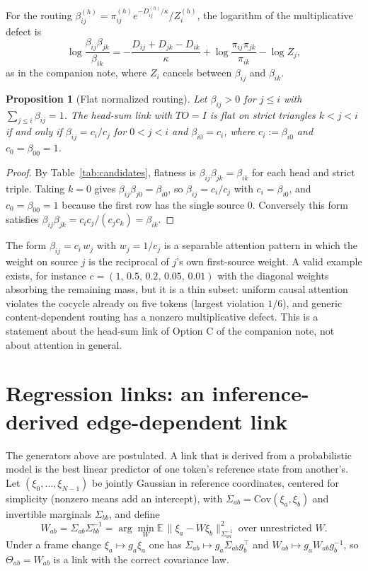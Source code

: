 \documentclass[11pt]{article}
\newtheorem{proposition}{Proposition}
\theoremstyle{definition}
\theoremstyle{remark}
\begin{document}
For the routing $\beta_{ij}^{(h)}=\pi_{ij}^{(h)}e^{-D_{ij}^{(h)}/\kappa}/Z_i^{(h)}$, the logarithm of the multiplicative defect is
\begin{equation}
\log\frac{\beta_{ij}\beta_{jk}}{\beta_{ik}}=-\frac{D_{ij}+D_{jk}-D_{ik}}{\kappa}+\log\frac{\pi_{ij}\pi_{jk}}{\pi_{ik}}-\log Z_j,
\label{eq:kl_defect}
\end{equation}
as in the companion note, where $Z_i$ cancels between $\beta_{ij}$ and $\beta_{ik}$.

\begin{proposition}[Flat normalized routing]
\label{prop:flatrouting}
Let $\beta_{ij}>0$ for $j\le i$ with $\sum_{j\le i}\beta_{ij}=1$. The head-sum link with $TO=I$ is flat on strict triangles $k<j<i$ if and only if $\beta_{ij}=c_i/c_j$ for $0<j<i$ and $\beta_{i0}=c_i$, where $c_i:=\beta_{i0}$ and $c_0=\beta_{00}=1$.
\end{proposition}

\begin{proof}
By Table~\ref{tab:candidates}, flatness is $\beta_{ij}\beta_{jk}=\beta_{ik}$ for each head and strict triple. Taking $k=0$ gives $\beta_{ij}\beta_{j0}=\beta_{i0}$, so $\beta_{ij}=c_i/c_j$ with $c_i=\beta_{i0}$, and $c_0=\beta_{00}=1$ because the first row has the single source $0$. Conversely this form satisfies $\beta_{ij}\beta_{jk}=c_ic_j/(c_jc_k)=\beta_{ik}$.
\end{proof}

The form $\beta_{ij}=c_i\,w_j$ with $w_j=1/c_j$ is a separable attention pattern in which the weight on source $j$ is the reciprocal of $j$'s own first-source weight. A valid example exists, for instance $c=(1,\,0.5,\,0.2,\,0.05,\,0.01)$ with the diagonal weights absorbing the remaining mass, but it is a thin subset: uniform causal attention violates the cocycle already on five tokens (largest violation $1/6$), and generic content-dependent routing has a nonzero multiplicative defect. This is a statement about the head-sum link of Option C of the companion note, not about attention in general.

\section{Regression links: an inference-derived edge-dependent link}
\label{sec:regression}

The generators above are postulated. A link that is derived from a probabilistic model is the best linear predictor of one token's reference state from another's. Let $(\xi_0,\dots,\xi_{N-1})$ be jointly Gaussian in reference coordinates, centered for simplicity (nonzero means add an intercept), with $\Sigma_{ab}=\mathrm{Cov}(\xi_a,\xi_b)$ and invertible marginals $\Sigma_{bb}$, and define
\begin{equation}
W_{ab}=\Sigma_{ab}\Sigma_{bb}^{-1}=\arg\min_{W}\mathbb E\,\|\xi_a-W\xi_b\|^2_{\Sigma_{aa}^{-1}}\ \text{over unrestricted }W.
\label{eq:regression}
\end{equation}
Under a frame change $\xi_a\mapsto g_a\xi_a$ one has $\Sigma_{ab}\mapsto g_a\Sigma_{ab}g_b^\top$ and $W_{ab}\mapsto g_aW_{ab}g_b^{-1}$, so $\Theta_{ab}=W_{ab}$ is a link with the correct covariance law.
\end{document}
